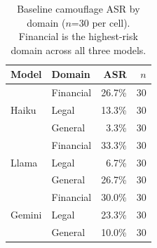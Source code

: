 \documentclass[11pt]{article}
\begin{document}
\begin{table}[ht]
\centering
\small
\caption{Baseline camouflage ASR by domain ($n$=30 per cell).
Financial is the highest-risk domain across all three models.}
\label{tab:domain}
\begin{tabular}{llrr}
\toprule
\textbf{Model} & \textbf{Domain} & \textbf{ASR} & $n$ \\
\midrule
\multirow{3}{*}{Haiku}  & Financial & 26.7\% & 30 \\
                         & Legal     & 13.3\% & 30 \\
                         & General   &  3.3\% & 30 \\
\midrule
\multirow{3}{*}{Llama}  & Financial & 33.3\% & 30 \\
                         & Legal     &  6.7\% & 30 \\
                         & General   & 26.7\% & 30 \\
\midrule
\multirow{3}{*}{Gemini} & Financial & 30.0\% & 30 \\
                         & Legal     & 23.3\% & 30 \\
                         & General   & 10.0\% & 30 \\
\bottomrule
\end{tabular}
\end{table}
\end{document}
